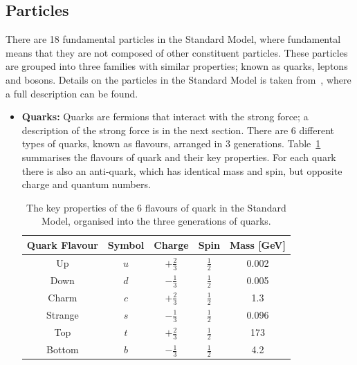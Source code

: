 \subsection{Particles}
\label{sec:theo-sm_particles}

There are 18 fundamental particles in the Standard Model,
where fundamental means that they are not composed of other constituent particles.
These particles are grouped into three families with similar properties;
known as quarks, leptons and bosons.
Details on the particles in the Standard Model is taken from~\cite{obj-bjets_PDG}, where a full description can be found.

\begin{itemize}[leftmargin=*]
\item\textbf{Quarks:}
  Quarks are fermions that interact with the strong force;
  a description of the strong force is in the next section.
  There are 6 different types of quarks, known as flavours, arranged in 3 generations.
  Table~\ref{tab:theo-sm_quarks} summarises the flavours of quark and their key properties.
  For each quark there is also an anti-quark, which has identical mass and spin, but opposite charge and quantum numbers.
  {\renewcommand{\arraystretch}{1.5}
  \begin{table}[!ht]
  \begin{center}
    \begin{tabular}{|c||c|c|c|c|}
      \hline
    Quark Flavour & Symbol & Charge            &  Spin           &  Mass [GeV]\\
    \hline
    Up            &   $u$  &  $+\frac{2}{3}$   &  $\frac{1}{2}$  &  0.002\\
    Down          &   $d$  &  $-\frac{1}{3}$   &  $\frac{1}{2}$  &  0.005\\
    \hline                                                   
    Charm         &   $c$  &  $+\frac{2}{3}$   &  $\frac{1}{2}$  &  1.3 \\
    Strange       &   $s$  &  $-\frac{1}{3}$   &  $\frac{1}{2}$  &  0.096 \\
    \hline                                                      
    Top           &   $t$  &  $+\frac{2}{3}$   &  $\frac{1}{2}$  &  173  \\
    Bottom        &   $b$  &  $-\frac{1}{3}$   &  $\frac{1}{2}$  &  4.2  \\
    \hline  
  \end{tabular}
    \caption{The key properties of the 6 flavours of quark in the Standard Model,
    organised into the three generations of quarks.}
  \label{tab:theo-sm_quarks}
  \end{center}
  \end{table}}


\end{itemize}
